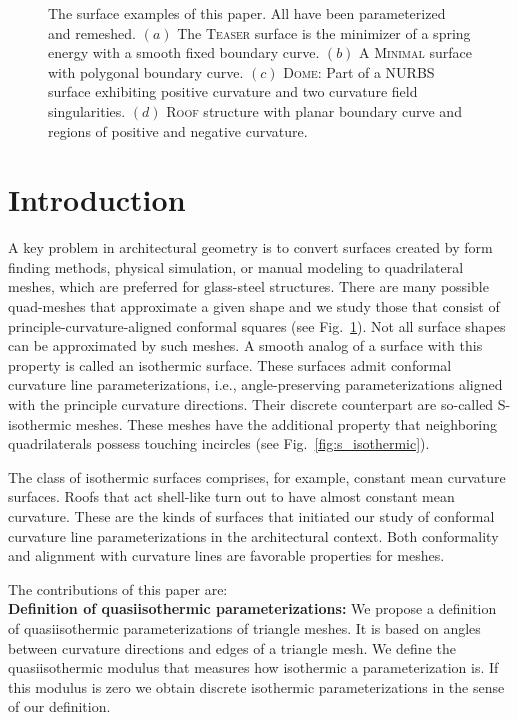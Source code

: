 \documentclass[Thesis.tex]{subfiles}
\begin{document}
\begin{figure}
\centering
\resizebox{\linewidth}{!}{}
\caption[Quasiisothermic parameterization: Examples]{The surface examples of this paper. All have been parameterized and
remeshed. $(a)$ The \textsc{Teaser} surface is the minimizer of a spring energy
with a smooth fixed boundary curve. $(b)$ A \textsc{Minimal} surface with
polygonal boundary curve. $(c)$ \textsc{Dome}: Part of a NURBS surface
exhibiting positive curvature and two curvature field singularities. $(d)$
\textsc{Roof} structure with planar boundary curve and regions of positive and
negative curvature.} 
\label{fig:all_mesh}
\end{figure}

\section{Introduction}
A key problem in architectural geometry is to convert surfaces created by form
finding methods, physical simulation, or manual modeling to quadrilateral
meshes, which are preferred for glass-steel structures. There are many 
possible quad-meshes that approximate a given shape and we study those that consist
of principle-curvature-aligned conformal squares (see Fig.~\ref{fig:all_mesh}). 
Not all surface shapes can be approximated by such meshes. A smooth analog of
a surface with this property is called an isothermic surface. These surfaces admit conformal
curvature line parameterizations, i.e., angle-preserving parameterizations
aligned with the principle curvature directions. Their discrete counterpart are 
so-called S-isothermic meshes. These meshes have the additional property that
neighboring quadrilaterals possess touching incircles (see
Fig.~\ref{fig:s_isothermic}).  

The class of isothermic surfaces comprises, for example, constant mean
curvature surfaces. Roofs that act shell-like turn out to have almost constant
mean curvature. These are the kinds of surfaces that initiated our study of
conformal curvature line parameterizations in the architectural context. Both
conformality and alignment with curvature lines are favorable
properties for meshes. 

\noindent The contributions of this paper are:\\
\noindent\textbf{Definition of quasiisothermic parameterizations:} 
We propose a definition of quasiisothermic parameterizations of triangle meshes. 
It is based on angles between curvature directions and edges of a triangle mesh.
We define the quasiisothermic modulus that measures how isothermic a 
parameterization is. If this modulus is zero we obtain discrete isothermic 
parameterizations in the sense of our definition.
\end{document}
